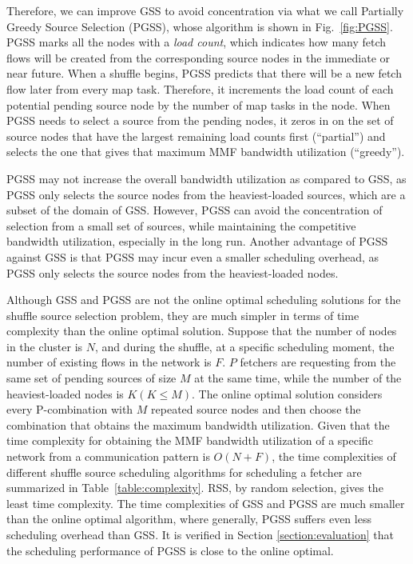 \documentclass[10pt,journal,compsoc]{IEEEtran}
\begin{document}
Therefore, we can improve GSS to avoid concentration via what we call Partially
Greedy Source Selection (PGSS), whose algorithm is shown in Fig.~\ref{fig:PGSS}.
PGSS marks all the nodes with a \emph{load count}, which indicates how many fetch flows will be created from
the corresponding source nodes in the immediate or near future.
When a shuffle begins, PGSS predicts that there will be a new fetch
flow later from every map task.
Therefore, it increments the load count of each potential pending
source node by the number of map tasks in the node.
When PGSS needs to select a source from the pending nodes, 
it zeros in on the set of source nodes that have the largest remaining load counts first (``partial'') and selects the one that gives that maximum MMF
bandwidth utilization (``greedy'').

PGSS may not increase the overall bandwidth utilization as compared to GSS, 
as PGSS only selects the source nodes from the heaviest-loaded
sources, which are a subset of the domain of GSS.
However, PGSS can avoid the concentration of selection from a small set
of sources,
while maintaining the competitive bandwidth utilization, especially in the long run. 
Another advantage of PGSS against GSS is that PGSS may incur
even a smaller scheduling overhead, 
as PGSS only selects the source nodes from the heaviest-loaded nodes. 

Although GSS and PGSS are not the online optimal scheduling solutions for the
shuffle source selection problem,
they are much simpler in terms of time complexity than the online
optimal solution. 
Suppose that the number of nodes in the cluster is $N$,
and during the shuffle, at a specific scheduling moment, 
the number of existing flows in the network is $F$.
$P$ fetchers are
requesting from the same set of pending sources of size $M$ at the same time, 
while the number of the heaviest-loaded nodes is $K(K \leq M)$.
The online optimal solution considers every P-combination with $M$ repeated source nodes and then choose the combination that obtains the maximum bandwidth utilization.  
Given that the time complexity for obtaining the MMF
bandwidth utilization
of a specific network from a communication pattern is $O(N+F)$, 
the time complexities of different shuffle source scheduling algorithms for scheduling a fetcher are summarized in Table~\ref{table:complexity}.
RSS, by random selection, gives the least time complexity. 
The time complexities of GSS and PGSS are much smaller than the online optimal algorithm, where generally, PGSS suffers even less scheduling overhead than GSS. 
It is verified in Section \ref{section:evaluation} that the scheduling
performance of PGSS is close to the online optimal.
\end{document}
